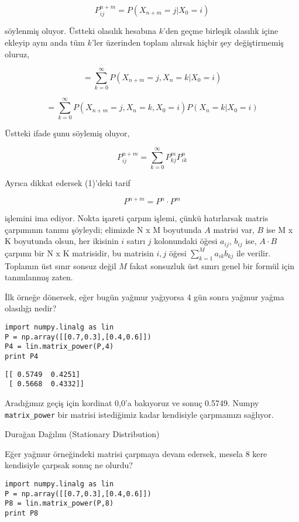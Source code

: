 \documentclass[12pt,fleqn]{article}\usepackage{../../common}
\begin{document}
$$
P_{ij}^{n+m} = P(X_{n+m} = j | X_0 = i )
$$

söylenmiş oluyor. Üstteki olasılık hesabına $k$'den geçme birleşik olasılık
içine ekleyip aynı anda tüm $k$'ler üzerinden toplam alırsak hiçbir şey
değiştirmemiş oluruz,

$$
= \sum_{k=0}^{\infty} P(X_{n+m} = j, X_n = k | X_0 = i )
$$

$$
= \sum_{k=0}^{\infty} P(X_{n+m} = j, X_n = k, X_0 = i )
P(X_n=k|X_0=i)
$$

Üstteki ifade şunu söylemiş oluyor,

$$
P_{ij}^{n+m} = \sum _{k=0}^{\infty} P_{kj}^m P_{ik}^n 
$$

Ayrıca dikkat edersek (1)'deki tarif

$$
P^{n+m} = P^n \cdot P^m
$$

işlemini ima ediyor. Nokta işareti çarpım işlemi, çünkü hatırlarsak matris
çarpımının tanımı şöyleydi; elimizde N x M boyutunda $A$ matrisi var, $B$ ise M
x K boyutunda olsun, her ikisinin $i$ satırı $j$ kolonundaki öğesi $a_{ij}$,
$b_{ij}$ ise, $A \cdot B$ çarpımı bir N x K matrisidir, bu matrisin $i,j$ öğesi
$\sum_{k=1}^{M} a_{ik}b_{kj}$ ile verilir. Toplamın üst sınır sonsuz değil
$M$ fakat sonsuzluk üst sınırı genel bir formül için tanımlanmış zaten.


İlk örneğe dönersek, eğer bugün yağmur yağıyorsa 4 gün sonra yağmur yağma
olasılığı nedir?

\begin{verbatim}
import numpy.linalg as lin
P = np.array([[0.7,0.3],[0.4,0.6]])
P4 = lin.matrix_power(P,4)
print P4
\end{verbatim}

\begin{verbatim}
[[ 0.5749  0.4251]
 [ 0.5668  0.4332]]
\end{verbatim}

Aradığımız geçiş için kordinat 0,0'a bakıyoruz ve sonuç 0.5749. Numpy
\verb!matrix_power! bir matrisi istediğimiz kadar kendisiyle çarpmamızı
sağlıyor. 

Durağan Dağılım (Stationary Distribution)

Eğer yağmur örneğindeki matrisi çarpmaya devam edersek, mesela 8 kere
kendisiyle çarpsak sonuç ne olurdu? 

\begin{verbatim}
import numpy.linalg as lin
P = np.array([[0.7,0.3],[0.4,0.6]])
P8 = lin.matrix_power(P,8)
print P8
\end{verbatim}
\end{document}
